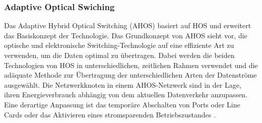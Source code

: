 \subsubsection{Adaptive Optical Swiching}
Das Adaptive Hybrid Optical Switching (AHOS) basiert auf HOS und erweitert das Basiskonzept der Technologie. Das Grundkonzept von AHOS sieht vor, die optische und elektronische Switching-Technologie auf eine effiziente Art zu verwenden, um die Daten optimal zu übertragen. Dabei werden die beiden Technologien von HOS in unterschiedlichen, zeitlichen Rahmen verwendet und die adäquate Methode zur Übertragung der unterschiedlichen Arten der Datenströme ausgewählt. Die Netzwerkknoten in einem AHOS-Netzwerk sind in der Lage, ihren Energieverbrauch abhängig von dem aktuellen Datenverkehr anzupassen. Eine derartige Anpassung ist das temporäre Abschalten von Ports oder Line Cards oder das Aktivieren eines stromsparenden Betriebszustandes \cite{adaptiveHOS}.

